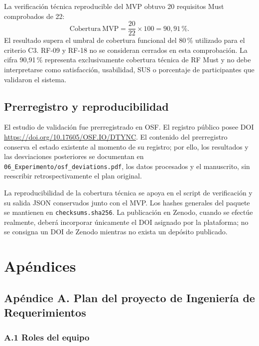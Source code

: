 \documentclass[11pt,a4paper]{article}
\begin{document}
	La verificación técnica reproducible del MVP obtuvo 20 requisitos Must comprobados de 22:
	\[
	\mathrm{Cobertura\ MVP}=\frac{20}{22}\times100=90{,}91\,\%.
	\]
	El resultado supera el umbral de cobertura funcional del 80\,\% utilizado para el criterio C3. RF-09 y RF-18 no se consideran cerrados en esta comprobación. La cifra 90,91\,\% representa exclusivamente cobertura técnica de RF Must y no debe interpretarse como satisfacción, usabilidad, SUS o porcentaje de participantes que validaron el sistema.
	
	\subsection{Prerregistro y reproducibilidad}
	El estudio de validación fue prerregistrado en OSF. El registro público posee DOI \url{https://doi.org/10.17605/OSF.IO/DTYNC}. El contenido del prerregistro conserva el estado existente al momento de su registro; por ello, los resultados y las desviaciones posteriores se documentan en \texttt{06\_Experimento/osf\_deviations.pdf}, los datos procesados y el manuscrito, sin reescribir retrospectivamente el plan original.
	
	La reproducibilidad de la cobertura técnica se apoya en el script de verificación y su salida JSON conservados junto con el MVP. Los hashes generales del paquete se mantienen en \texttt{checksums.sha256}. La publicación en Zenodo, cuando se efectúe realmente, deberá incorporar únicamente el DOI asignado por la plataforma; no se consigna un DOI de Zenodo mientras no exista un depósito publicado.
	
	
	\section{Apéndices}
	
	\subsection{Apéndice A. Plan del proyecto de Ingeniería de Requerimientos}
	
	\subsubsection{A.1 Roles del equipo}
	
\end{document}
